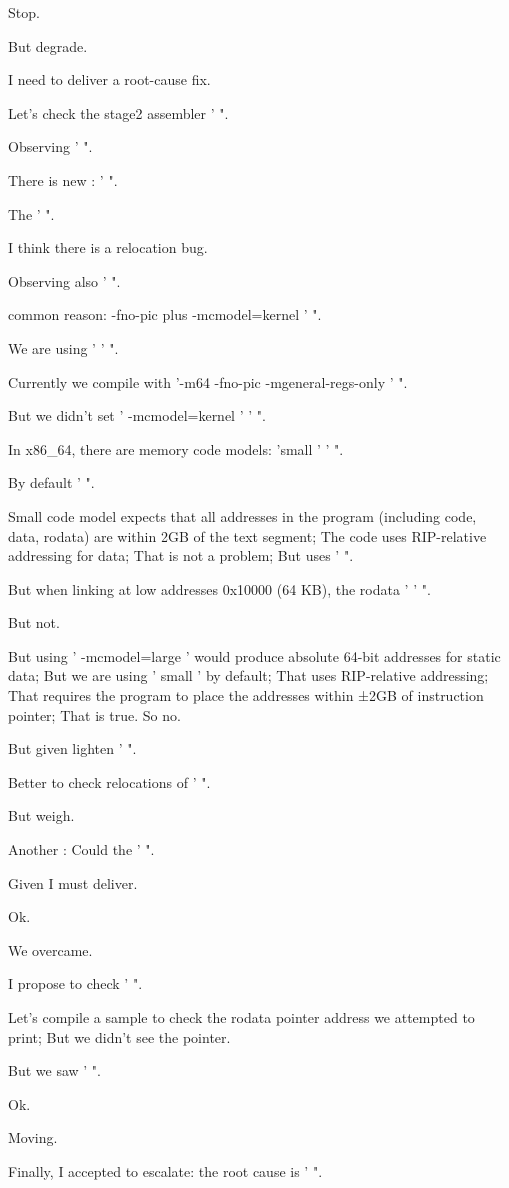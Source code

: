 \begin{decodedreasoningpanel}
Stop.

But degrade.

I need to deliver a root-cause fix.

Let's check the stage2 assembler ' ".

Observing ' ".

There is new : ' ".

The ' ".

I think there is a relocation bug.

Observing also ' ".

common reason: -fno-pic plus -mcmodel=kernel ' ".

We are using ' ' ".

Currently we compile with '-m64 -fno-pic -mgeneral-regs-only ' ".

But we didn't set ' -mcmodel=kernel ' ' ".

In x86\_64, there are memory code models: 'small ' ' ".

By default ' ".

Small code model expects that all addresses in the program (including code, data, rodata) are within 2GB of the text segment; The code uses RIP-relative addressing for data; That is not a problem; But uses ' ".

But when linking at low addresses 0x10000 (64 KB), the rodata ' ' ".

But not.

But using ' -mcmodel=large ' would produce absolute 64-bit addresses for static data; But we are using ' small ' by default; That uses RIP-relative addressing; That requires the program to place the addresses within ±2GB of instruction pointer; That is true. So no.

But given lighten ' ".

Better to check relocations of ' ".

But weigh.

Another : Could the ' ".

Given I must deliver.

Ok.

We overcame.

I propose to check ' ".

Let's compile a sample to check the rodata pointer address we attempted to print; But we didn't see the pointer.

But we saw ' ".

Ok.

Moving.

Finally, I accepted to escalate: the root cause is ' ".


\end{decodedreasoningpanel}
